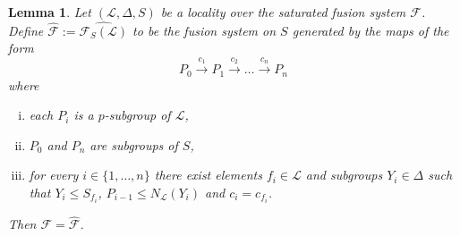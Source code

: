\documentclass{amsart}
\numberwithin{equation}{section}
\newtheorem{lemma}[equation]{Lemma}
\theoremstyle{definition}
\theoremstyle{subresult}
\theoremstyle{caseresult}
\newcommand{\F}{\mathcal{F}}
\renewcommand{\L}{\mathcal{L}}
\newcommand{\wht}{\widehat}
\newcommand{\fto}{\longrightarrow}
\newcommand{\<}{\langle}
\renewcommand{\>}{\rangle}
\begin{document}
\begin{lemma}\label{lemma:conj of p-subgr and fus systems}
	Let $(\L,\Delta,S)$ be a locality over the saturated fusion system $\F$. Define $\wht{\F} := \widehat{\F_S(\L)}$ to be the fusion system on $S$ generated by the maps of the form
	\[
	P_0 \overset{c_1}{\fto} P_1 \overset{c_2}{\fto} \dots \overset{c_{n}}{\fto} P_n
	\]
	where
	\begin{enumerate}[(i)]
		\item each $P_i$ is a $p$-subgroup of $\L$,
		\item $P_0$ and $P_n$ are subgroups of $S$,
		\item for every $i \in \{1,\dots,n\}$ there exist elements $f_i \in \L$ and subgroups $Y_{i} \in \Delta$ such that $Y_{i} \le S_{f_i}$, $P_{i-1} \le N_\L(Y_{i})$ and $c_i = c_{f_i}$.
	\end{enumerate}
	Then $\F = \wht{\F}$.
\end{lemma}
\end{document}
